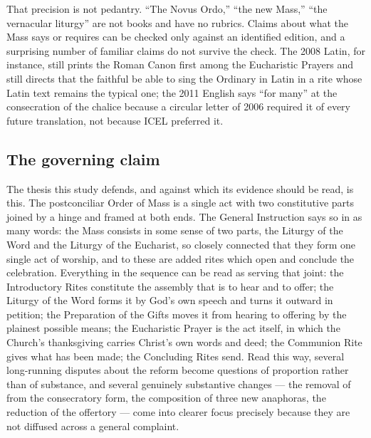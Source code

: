 That precision is not pedantry. ``The Novus Ordo,'' ``the new Mass,'' ``the vernacular
liturgy'' are not books and have no rubrics. Claims about what the Mass says or requires can be
checked only against an identified edition, and a surprising number of familiar claims do not
survive the check. The 2008 Latin, for instance, still prints the Roman Canon first among the
Eucharistic Prayers and still directs that the faithful be able to sing the Ordinary in Latin
in a rite whose Latin text remains the typical one; the 2011 English says ``for many'' at the
consecration of the chalice because a circular letter of 2006 required it of every future
translation, not because ICEL preferred it.

\subsection*{The governing claim}

The thesis this study defends, and against which its evidence should be read, is this. The
postconciliar Order of Mass is a single act with two constitutive parts joined by a hinge and
framed at both ends. The General Instruction says so in as many words: the Mass consists in
some sense of two parts, the Liturgy of the Word and the Liturgy of the Eucharist, so closely
connected that they form one single act of worship, and to these are added rites which open and
conclude the celebration. Everything in the sequence can be read as serving that joint: the
Introductory Rites constitute the assembly that is to hear and to offer; the Liturgy of the
Word forms it by God's own speech and turns it outward in petition; the Preparation of the
Gifts moves it from hearing to offering by the plainest possible means; the Eucharistic Prayer
is the act itself, in which the Church's thanksgiving carries Christ's own words and deed; the
Communion Rite gives what has been made; the Concluding Rites send. Read this way, several
long-running disputes about the reform become questions of proportion rather than of substance,
and several genuinely substantive changes --- the removal of  from the
consecratory form, the composition of three new anaphoras, the reduction of the offertory ---
come into clearer focus precisely because they are not diffused across a general complaint.

